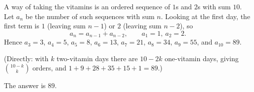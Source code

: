 A way of taking the vitamins is an ordered sequence of $1$s and $2$s with sum $10$. Let $a_n$ be the number of such sequences with sum $n$. Looking at the first day, the first term is $1$ (leaving sum $n-1$) or $2$ (leaving sum $n-2$), so
\[
a_n=a_{n-1}+a_{n-2},\qquad a_1=1,\ a_2=2.
\]
Hence $a_3=3$, $a_4=5$, $a_5=8$, $a_6=13$, $a_7=21$, $a_8=34$, $a_9=55$, and $a_{10}=89$.

(Directly: with $k$ two-vitamin days there are $10-2k$ one-vitamin days, giving $\binom{10-k}{k}$ orders, and $1+9+28+35+15+1=89$.)

The answer is $\boxed{89}$.
